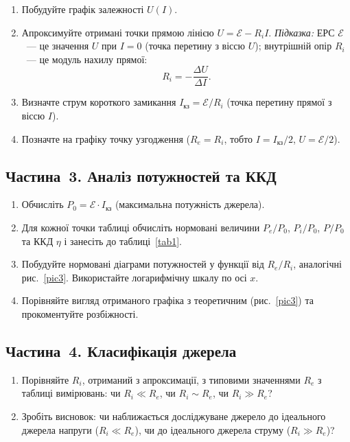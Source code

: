 \documentclass{LabWork}
\begin{document}
\begin{enumerate}
    \item Побудуйте графік залежності $U(I)$.

    \item Апроксимуйте отримані точки прямою лінією $U = \mathcal{E} - R_i I$. \emph{Підказка:} ЕРС $\mathcal{E}$~--- це значення $U$ при $I = 0$ (точка перетину з віссю $U$); внутрішній опір $R_i$~--- це модуль нахилу прямої:
    \begin{equation*}
        R_i = -\frac{\Delta U}{\Delta I}.
    \end{equation*}

    \item Визначте струм короткого замикання $I_\text{кз} = \mathcal{E}/R_i$ (точка перетину прямої з віссю $I$).

    \item Позначте на графіку точку узгодження ($R_e = R_i$, тобто $I = I_\text{кз}/2$, $U = \mathcal{E}/2$).
\end{enumerate}

\subsection*{Частина~3. Аналіз потужностей та ККД}

\begin{enumerate}
    \item Обчисліть $P_0 = \mathcal{E} \cdot I_\text{кз}$ (максимальна потужність джерела).

    \item Для кожної точки таблиці обчисліть нормовані величини $P_e/P_0$, $P_i/P_0$, $P/P_0$ та ККД $\eta$ і занесіть до таблиці~\ref{tab1}.

    \item Побудуйте нормовані діаграми потужностей у функції від $R_e/R_i$, аналогічні рис.~\ref{pic3}. Використайте логарифмічну шкалу по осі $x$.

    \item Порівняйте вигляд отриманого графіка з теоретичним (рис.~\ref{pic3}) та прокоментуйте розбіжності.
\end{enumerate}

\subsection*{Частина~4. Класифікація джерела}

\begin{enumerate}
    \item Порівняйте $R_i$, отриманий з апроксимації, з типовими значеннями $R_e$ з таблиці вимірювань: чи $R_i \ll R_e$, чи $R_i \sim R_e$, чи $R_i \gg R_e$?
    \item Зробіть висновок: чи наближається досліджуване джерело до ідеального джерела напруги ($R_i \ll R_e$), чи до ідеального джерела струму ($R_i \gg R_e$)?
\end{enumerate}
\end{document}
